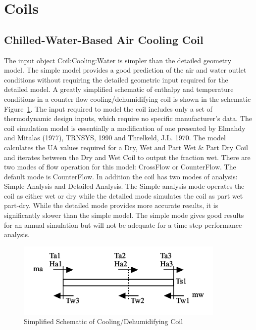 \section{Coils }\label{coils}

\subsection{Chilled-Water-Based Air Cooling Coil}\label{chilled-water-based-air-cooling-coil}

The input object Coil:Cooling:Water is simpler than the detailed geometry model. The simple model provides a good prediction of the air and water outlet conditions without requiring the detailed geometric input required for the detailed model. A greatly simplified schematic of enthalpy and temperature conditions in a counter flow cooling/dehumidifying coil is shown in the schematic Figure~\ref{fig:simplified-schematic-of-coolingdehumidifying}. The input required to model the coil includes only a set of thermodynamic design inputs, which require no specific manufacturer's data. The coil simulation model is essentially a modification of one presented by Elmahdy and Mitalas (1977), TRNSYS, 1990 and Threlkeld, J.L. 1970. The model calculates the UA values required for a Dry, Wet and Part Wet \& Part Dry Coil and iterates between the Dry and Wet Coil to output the fraction wet. There are two modes of flow operation for this model: CrossFlow or CounterFlow. The default mode is CounterFlow. In addition the coil has two modes of analysis: Simple Analysis and Detailed Analysis. The Simple analysis mode operates the coil as either wet or dry while the detailed mode simulates the coil as part wet part-dry. While the detailed mode provides more accurate results, it is significantly slower than the simple model. The simple mode gives good results for an annual simulation but will not be adequate for a time step performance analysis.

\begin{figure}[hbtp] %
\centering
\includegraphics[width=0.9\textwidth, height=0.9\textheight, keepaspectratio=true]{media/image3304.svg.png}
\caption{  Simplified Schematic of Cooling/Dehumidifying Coil \protect \label{fig:simplified-schematic-of-coolingdehumidifying}}
\end{figure}

